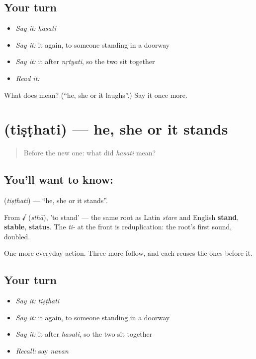\subsection*{Your turn}
\begin{itemize}
\raggedright
  \item \emph{Say it:} \emph{hasati}
  \item \emph{Say it:} it again, to someone standing in a doorway
  \item \emph{Say it:} it after \emph{nṛtyati}, so the two sit together
  \item \emph{Read it:} \textbf{}
\end{itemize}

\begin{tcolorbox}[breakable,colback=teal!4,colframe=teal!35!black,title={Before you move on}]
What does  mean? (\textquotedblleft{}he, she or it laughs\textquotedblright{}.) Say it once more.
\end{tcolorbox}
\section[\texorpdfstring{\sk{तिष्ठति} (tiṣṭhati)}{तिष्ठति (tiṣṭhati)}]{ (tiṣṭhati) — he, she or it stands}

\label{lesson:SA-C21-stand}



\begin{quote}
Before the new one: what did \emph{hasati} mean?
\end{quote}

\subsection*{You'll want to know: }
\textbf{} (\emph{tiṣṭhati}) — \textquotedblleft{}he, she or it stands\textquotedblright{}.

From \textbf{√} (\emph{sthā}), 'to stand' — the same root as Latin \emph{stare} and English \textbf{stand}, \textbf{stable}, \textbf{status}. The \emph{ti-} at the front is reduplication: the root's first sound, doubled.

\begin{grammarlens}[title={What you've built}]
One more everyday action. Three more follow, and each reuses the ones before it.
\end{grammarlens}

\subsection*{Your turn}
\begin{itemize}
\raggedright
  \item \emph{Say it:} \emph{tiṣṭhati}
  \item \emph{Say it:} it again, to someone standing in a doorway
  \item \emph{Say it:} it after \emph{hasati}, so the two sit together
  \item \emph{Recall:} say \emph{navan}
\end{itemize}

